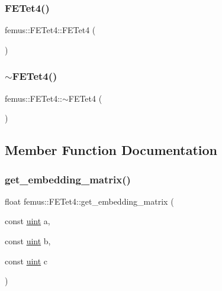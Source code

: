 \subsubsection{\texorpdfstring{F\+E\+Tet4()}{FETet4()}}
{\footnotesize\ttfamily femus\+::\+F\+E\+Tet4\+::\+F\+E\+Tet4 (\begin{DoxyParamCaption}{ }\end{DoxyParamCaption})}

\mbox{\label{classfemus_1_1_f_e_tet4_a5e0ec354749e982f4f0e105133819260}} 
\subsubsection{\texorpdfstring{$\sim$\+F\+E\+Tet4()}{~FETet4()}}
{\footnotesize\ttfamily femus\+::\+F\+E\+Tet4\+::$\sim$\+F\+E\+Tet4 (\begin{DoxyParamCaption}{ }\end{DoxyParamCaption})}



\subsection{Member Function Documentation}
\mbox{\label{classfemus_1_1_f_e_tet4_a36513f2c430b37b0dd47e4ad5827fd01}} 
\subsubsection{\texorpdfstring{get\+\_\+embedding\+\_\+matrix()}{get\_embedding\_matrix()}}
{\footnotesize\ttfamily float femus\+::\+F\+E\+Tet4\+::get\+\_\+embedding\+\_\+matrix (\begin{DoxyParamCaption}\item[{const \mbox{\hyperlink{_typedefs_8hpp_a91ad9478d81a7aaf2593e8d9c3d06a14}{uint}}}]{a,  }\item[{const \mbox{\hyperlink{_typedefs_8hpp_a91ad9478d81a7aaf2593e8d9c3d06a14}{uint}}}]{b,  }\item[{const \mbox{\hyperlink{_typedefs_8hpp_a91ad9478d81a7aaf2593e8d9c3d06a14}{uint}}}]{c }\end{DoxyParamCaption})\hspace{0.3cm}{\ttfamily [virtual]}}



